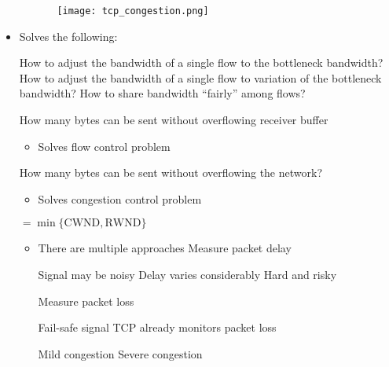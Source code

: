 \begin{itemize}
\begin{itemize}
\begin{itemize}
                    \texttt{[image: tcp\_congestion.png]}
                \end{itemize}
        \end{itemize}
    \item Solves the following:
        \begin{itemize}
             How to adjust the bandwidth of a single flow to the bottleneck bandwidth?
             How to adjust the bandwidth of a single flow to variation of the bottleneck bandwidth?
             How to share bandwidth ``fairly'' among flows?
        \end{itemize}
        \begin{itemize}
             How many bytes can be sent without overflowing receiver buffer
                \begin{itemize}
                    \item Solves flow control problem
                \end{itemize}
             How many bytes can be sent without overflowing the network?
                \begin{itemize}
                    \item Solves congestion control problem
                \end{itemize}
             $= \min \{\text{CWND}, \text{RWND}\}$
        \end{itemize}
        \begin{itemize}
            \item There are multiple approaches
             Measure packet delay
                \begin{itemize}
                    \icon Signal may be noisy
                    \icon Delay varies considerably
                    \icon Hard and risky
                \end{itemize}
             Measure packet loss
                \begin{itemize}
                    \ipro Fail-safe signal
                    \ipro TCP already monitors packet loss
                        \begin{itemize}
                             Mild congestion
                             Severe congestion
                        \end{itemize}

\end{itemize}
\end{itemize}
\end{itemize}
